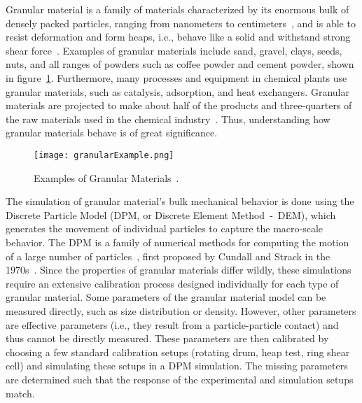 Granular material is a family of materials characterized by its enormous bulk of densely packed particles, ranging from nanometers to centimeters~\cite{introGranular2}, and is able to resist deformation and form heaps, i.e., behave like a solid and withstand strong shear force~\cite{introGranular3}. Examples of granular materials include sand, gravel, clays, seeds, nuts, and all ranges of powders such as coffee powder and cement powder, shown in figure~\ref{fig:granularExample}. Furthermore, many processes and equipment in chemical plants use granular materials, such as catalysis, adsorption, and heat exchangers. Granular materials are projected to make about half of the products and three-quarters of the raw materials used in the chemical industry~\cite{introGranular}. Thus, understanding how granular materials behave is of great significance. 

\begin{figure}[H]
 \centering
 \texttt{[image: granularExample.png]}
 \caption{Examples of Granular Materials~\cite{granularExample}.}
 \label{fig:granularExample}
\end{figure}

The simulation of granular material's bulk mechanical behavior is done using the Discrete Particle Model (DPM, or Discrete Element Method~-~DEM), which generates the movement of individual particles to capture the macro-scale behavior. The DPM is a family of numerical methods for computing the motion of a large number of particles~\cite{Weng:2015}, first proposed by Cundall and Strack in the 1970s~\cite{cundallstrack}.
Since the properties of granular materials differ wildly, these simulations require an extensive calibration process designed individually for each type of granular material. Some parameters of the granular material model can be measured directly, such as size distribution or density. However, other parameters are effective parameters (i.e., they result from a particle-particle contact) and thus cannot be directly measured. These parameters are then calibrated by choosing a few standard calibration setups (rotating drum, heap test, ring shear cell) and simulating these setups in a DPM simulation. The missing parameters are determined such that the response of the experimental and simulation setups match.

